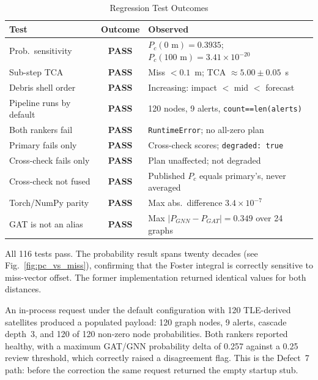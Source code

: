 \documentclass[conference]{IEEEtran}
\newcommand{\Pc}{P_c}
\begin{document}
\begin{table}[h]
\caption{Regression Test Outcomes}
\label{tab:regression2}
\centering
\footnotesize
\begin{tabular}{@{}p{2.2cm}cp{4.1cm}@{}}
\toprule
\textbf{Test} & \textbf{Outcome} & \textbf{Observed} \\
\midrule
Prob.\ sensitivity & \textbf{PASS}
  & $\Pc(0\text{ m})=0.3935$;\newline
    $\Pc(100\text{ m})=3.41\times10^{-20}$ \\
\addlinespace
Sub-step TCA & \textbf{PASS}
  & Miss $<0.1$~m; TCA $\approx5.00\pm0.05$~s \\
\addlinespace
Debris shell order & \textbf{PASS}
  & Increasing: impact $<$ mid $<$ forecast \\
\addlinespace
Pipeline runs by default & \textbf{PASS}
  & 120 nodes, 9 alerts, \texttt{count==len(alerts)} \\
\addlinespace
Both rankers fail & \textbf{PASS}
  & \texttt{RuntimeError}; no all-zero plan \\
\addlinespace
Primary fails only & \textbf{PASS}
  & Cross-check scores; \texttt{degraded: true} \\
\addlinespace
Cross-check fails only & \textbf{PASS}
  & Plan unaffected; not degraded \\
\addlinespace
Cross-check not fused & \textbf{PASS}
  & Published $\Pc$ equals primary's, never averaged \\
\addlinespace
Torch/NumPy parity & \textbf{PASS}
  & Max abs.\ difference $3.4\times10^{-7}$ \\
\addlinespace
GAT is not an alias & \textbf{PASS}
  & Max $|P_{GNN}-P_{GAT}|=0.349$ over 24 graphs \\
\bottomrule
\end{tabular}
\end{table}

All 116 tests pass. The probability result spans twenty decades (see
Fig.~\ref{fig:pc_vs_miss}), confirming that the Foster integral is correctly
sensitive to miss-vector offset. The former implementation returned identical
values for both distances.

An in-process request under the default configuration with 120 TLE-derived
satellites produced a populated payload: 120 graph nodes, 9 alerts, cascade
depth~3, and 120 of 120 non-zero node probabilities. Both rankers reported
healthy, with a maximum GAT/GNN probability delta of 0.257 against a 0.25 review
threshold, which correctly raised a disagreement flag. This is the Defect~7 path:
before the correction the same request returned the empty startup stub.
\end{document}
